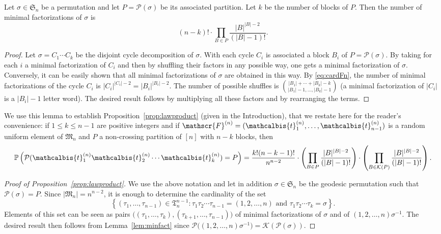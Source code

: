 \documentclass[AHL,XML,longabstracts,Unicode]{cedram}
\def\PPP{\mathcal P}
\def\tb{\mathcalbis{t}}
\renewcommand\Pr[1]{\mathbb{P}\left(#1\right)}
\begin{document}
\begin{lemma}\label{lem:minfact}
Let $\sigma \in \mathfrak{S}_{n}$ be a permutation and let $P=\PPP(\sigma)$ be its associated partition. Let $k$ be the number of blocks of $P$. Then the number of minimal factorizations of $\sigma$ is
\[ \left( n- k \right) !  \cdot\prod_{B \in P}    \frac{|B|^{|B|-2}}{(|B|-1)!}.\]
\end{lemma}

\begin{proof}
Let $\sigma=C_1  \cdots C_k$ be the disjoint cycle decomposition of $\sigma$.
With each cycle $C_i$ is associated a block $B_i$ of $P=\PPP(\sigma)$.
By taking for each $i$ a minimal factorization of $C_i$ and then by shuffling their factors in any possible way, one gets a minimal factorization of $\sigma$. Conversely, it can be easily shown
that all minimal factorizations of $\sigma$ are obtained in this way.
 By \eqref{eq:cardFn}, the number of minimal factorizations of the cycle $C_i$
 is $|C_i|^{|C_i|-2}=|B_i|^{|B_i|-2} $.
 The number of possible shuffles is
$ \binom{|B_{1}|+\cdots+|B_{k}|-k}{|B_{1}|-1, \ldots,|B_{k}|-1 }$
(a minimal factorization of $|C_{i}|$ is a $|B_i|-1$ letter word).
The desired result follows by multiplying all these factors and by rearranging the terms.
\end{proof}

We use this lemma to establish Proposition~\ref{prop:lawproduct} (given in the Introduction),
that we restate here for the reader's convenience:
if $1 \leq k \leq n -1$ are positive integers and if
$\mathscr{F}^{(n)}= (\tb_{1}^{(n)}, \ldots, \tb_{n-1}^{(n)})$ is a random uniform element of $ \mathfrak{M}_{n}$
and $P$ a non-crossing partition of $[n]$ with $n-k$ blocks,
then
\[\Pr{\PPP(\tb_{1}^{(n)} \tb_{2}^{(n)} \cdots \tb_{k}^{(n)})=P}= \frac{k! (n-k-1)!}{n^{n-2}}  \cdot  \left( \prod_{B \in P} \frac{|B|^{|B|-2}}{(|B|-1)!} \right) \cdot \left(  \prod_{B \in  \mathcal{K}(P)} \frac{|B|^{|B|-2}}{(|B|-1)!} \right).\]

\begin{proof}[Proof of Proposition~\ref{prop:lawproduct}]
  We use the above notation and
let in addition $\sigma \in \mathfrak{S}_{n}$ be the geodesic permutation such that $\PPP(\sigma)=P$.  Since $ | \mathfrak{M}_{n}|  =n^{n-2}$, it is enough to determine the cardinality of the set
\[\left\{ (\tau_{1}, \ldots, \tau_{n-1}) \in \mathfrak{T}_{n}^{n-1} : \tau_{1} \tau_{2} \cdots \tau_{n-1}= (1,2, \ldots,n) \textrm{ and } \tau_{1} \tau_{2} \cdots \tau_{k}= \sigma \right\}.\]
Elements of this set can be seen as pairs $\big( (\tau_1,\dots,\tau_k),(\tau_{k+1},\dots,\tau_{n-1}) \big)$
of minimal factorizations of $\sigma$
and of $(1,2, \ldots,n) \sigma^{-1}$.
The desired result then follows from Lemma~\ref{lem:minfact}
since $ \PPP \big(  (1,2, \ldots,n) \sigma^{-1} \big) =\mathcal{K}(\PPP(\sigma))$.
\end{proof}
\end{document}
